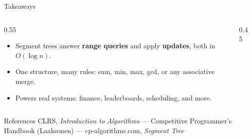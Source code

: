 \documentclass[10pt,aspectratio=169]{beamer}
\begin{document}
\begin{frame}{Takeaways}
\small
\begin{columns}[T]
\begin{column}{0.55\textwidth}
\begin{itemize}\setlength{\itemsep}{6pt}
  \item[\textcolor{accentgreen}{\ding{51}}] Segment trees answer \textbf{range queries} and apply \textbf{updates}, both in $O(\log n)$.
  \item[\textcolor{accentgreen}{\ding{51}}] One structure, many rules: sum, min, max, gcd, or any associative merge.
  \item[\textcolor{accentgreen}{\ding{51}}] Powers real systems: finance, leaderboards, scheduling, and more.
\end{itemize}
\end{column}
\begin{column}{0.45\textwidth}
\centering
{}
\end{column}
\end{columns}
\vspace{0.3cm}
\begin{block}{References}
\scriptsize
CLRS, \textit{Introduction to Algorithms} --- Competitive Programmer's Handbook (Laaksonen) --- cp-algorithms.com, \textit{Segment Tree}
\end{block}
\end{frame}
\end{document}
